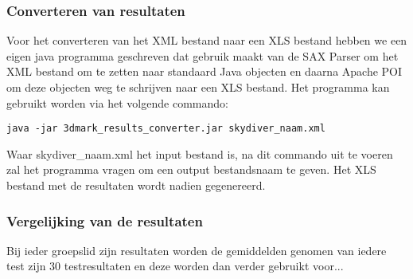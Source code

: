 \subsubsection{Converteren van resultaten}
Voor het converteren van het XML bestand naar een XLS bestand hebben we een eigen java programma geschreven dat gebruik maakt van de SAX Parser om het XML bestand om te zetten naar standaard Java objecten en daarna Apache POI om deze objecten weg te schrijven naar een XLS bestand. Het programma kan gebruikt worden via het volgende commando:
\begin{lstlisting}
java -jar 3dmark_results_converter.jar skydiver_naam.xml
\end{lstlisting}
Waar skydiver\_naam.xml het input bestand is, na dit commando uit te voeren zal het programma vragen om een output bestandsnaam te geven. Het XLS bestand met de resultaten wordt nadien gegenereerd.

\subsubsection{Vergelijking van de resultaten}
Bij ieder groepslid zijn resultaten worden de gemiddelden genomen van iedere test zijn 30 testresultaten en deze worden dan verder gebruikt voor...